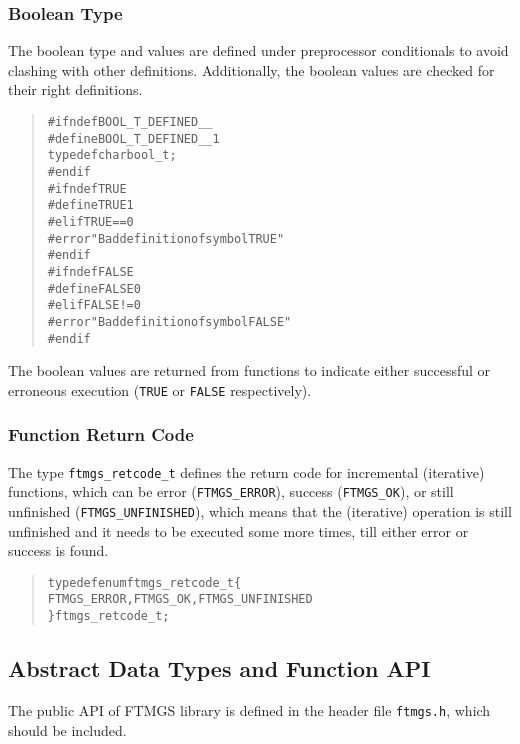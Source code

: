 \documentclass[a4paper]{article}
\newenvironment{code}%
{\begin{quote}\footnotesize\begin{alltt}}%
{\end{alltt}\end{quote}}%
\begin{document}
\subsubsection*{Boolean Type}

The boolean type and values are defined under preprocessor
conditionals to avoid clashing with other definitions. Additionally,
the boolean values are checked for their right definitions.

\begin{code}
#ifndef BOOL_T_DEFINED__
#define BOOL_T_DEFINED__    1
typedef char bool_t;
#endif
#ifndef TRUE
#define TRUE    1
#elif TRUE == 0
#error "Bad definition of symbol TRUE"
#endif
#ifndef FALSE
#define FALSE   0
#elif FALSE != 0
#error "Bad definition of symbol FALSE"
#endif
\end{code}

The boolean values are returned from functions to indicate either
successful or erroneous execution (\verb|TRUE| or \verb|FALSE|
respectively).

\subsubsection*{Function Return Code}

The type \verb|ftmgs_retcode_t| defines the return code for
incremental (iterative) functions, which can be error
(\verb|FTMGS_ERROR|), success (\verb|FTMGS_OK|), or still unfinished
(\verb|FTMGS_UNFINISHED|), which means that the (iterative) operation
is still unfinished and it needs to be executed some more times,
till either error or success is found.

\begin{code}
typedef enum ftmgs_retcode_t \{
    FTMGS_ERROR, FTMGS_OK, FTMGS_UNFINISHED
\} ftmgs_retcode_t;
\end{code}

\subsection{Abstract Data Types and Function API}

The public API of FTMGS library is defined in the header file
\verb|ftmgs.h|, which should be included.
\end{document}
